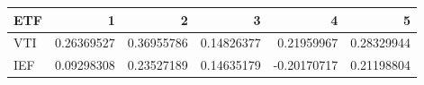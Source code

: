 \begin{tabular}{lrrrrr}
\toprule
ETF & 1 & 2 & 3 & 4 & 5 \\
\midrule
VTI & 0.26369527 & 0.36955786 & 0.14826377 & 0.21959967 & 0.28329944 \\
IEF & 0.09298308 & 0.23527189 & 0.14635179 & -0.20170717 & 0.21198804 \\
\bottomrule
\end{tabular}
